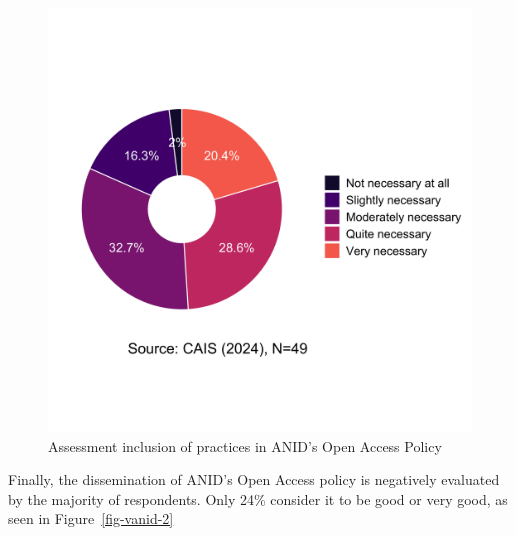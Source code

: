 \documentclass[
  letterpaper,
  DIV=11,
  numbers=noendperiod]{scrartcl}
\begin{document}
\begin{figure}
\begin{minipage}[t]{0.50\linewidth}
{{\includegraphics{paper_files/figure-pdf/fig-vanid-grid-b-2.png}

}

}

\end{minipage}%

\caption{\label{fig-vanid-grid-b}Assessment inclusion of practices in
ANID's Open Access Policy}

\end{figure}

Finally, the dissemination of ANID's Open Access policy is negatively
evaluated by the majority of respondents. Only 24\% consider it to be
good or very good, as seen in Figure~\ref{fig-vanid-2}
\end{document}
